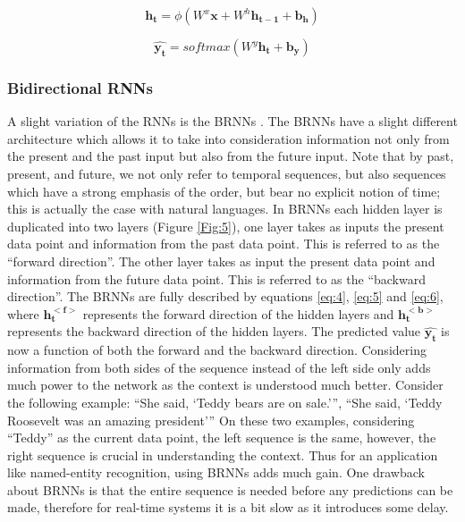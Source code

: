 \begin{equation}
\label{eq:1}
\mathbf{h_t} = \phi(W^x \mathbf{x} + W^h \mathbf{h_{t-1}} + \mathbf{b_h})
\end{equation}

\begin{equation}
\label{eq:2}
\mathbf{\widehat{y_t}} = softmax(W^y \mathbf{h_t} + \mathbf{b_y})
\end{equation}


\subsubsection{Bidirectional \ac{RNN}s}
\label{bg:s2_sub2_subsub1}

A slight variation of the \ac{RNN}s is the \ac{BRNN}s \cite{schuster1997bidirectional}. The \ac{BRNN}s have a slight different architecture which allows it to take into consideration information not only from the present and the past input but also from the future input. Note that by past, present, and future, we not only refer to temporal sequences, but also sequences which have a strong emphasis of the order, but bear no explicit notion of time; this is actually the case with natural languages. In \ac{BRNN}s each hidden layer is duplicated into two layers (Figure \ref{Fig:5}), one layer takes as inputs the present data point and information from the past data point. This is referred to as the \enquote{forward direction}. The other layer takes as input the present data point and information from the future data point. This is referred to as the \enquote{backward direction}. The \ac{BRNN}s are fully described by equations \ref{eq:4}, \ref{eq:5} and \ref{eq:6}, where $ \mathbf{h_t^{<f>}} $ represents the forward direction of the hidden layers and $ \mathbf{h_t^{<b>}} $ represents the backward direction of the hidden layers. The predicted value $ \mathbf{\widehat{y_t}} $ is now a function of both the forward and the backward direction. Considering information from both sides of the sequence instead of the left side only adds much power to the network as the context is understood much better. Consider the following example: \enquote{She said, \enquote{Teddy bears are on sale.}}, \enquote{She said, \enquote{Teddy Roosevelt was an amazing president}} On these two examples, considering \enquote{Teddy} as the current data point, the left sequence is the same, however, the right sequence is crucial in understanding the context. Thus for an application like named-entity recognition, using \ac{BRNN}s adds much gain. One drawback about \ac{BRNN}s is that the entire sequence is needed before any predictions can be made, therefore for real-time systems it is a bit slow as it introduces some delay.

